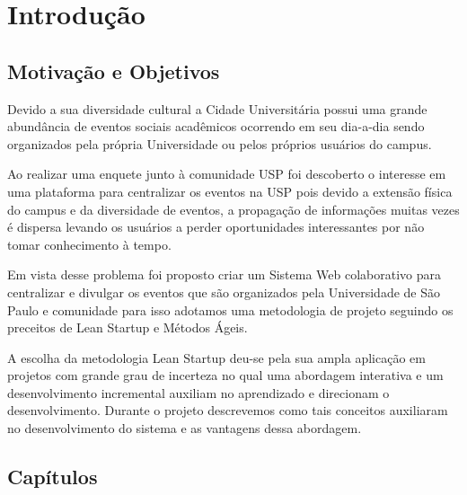 \chapter{Introdução}
\label{cap:introducao}
\section{Motivação e Objetivos}

\par Devido a sua diversidade cultural a Cidade Universitária possui uma grande abundância de eventos sociais acadêmicos ocorrendo em seu dia-a-dia sendo organizados pela própria Universidade ou pelos próprios usuários do campus.

\par Ao realizar uma enquete junto à comunidade USP foi descoberto o interesse em uma plataforma para centralizar os eventos na USP pois devido a extensão física do campus e da diversidade de eventos, a propagação de informações muitas vezes é dispersa levando os usuários a perder oportunidades interessantes por não tomar conhecimento à tempo.

\par Em vista desse problema foi proposto criar um Sistema Web colaborativo para centralizar e divulgar os eventos que são organizados pela Universidade de São Paulo e comunidade para isso adotamos uma metodologia de projeto seguindo os preceitos de Lean Startup e Métodos Ágeis.

\par A escolha da metodologia Lean Startup deu-se pela sua ampla aplicação em projetos com grande grau de incerteza no qual uma abordagem interativa e um desenvolvimento incremental auxiliam no aprendizado e direcionam o desenvolvimento. Durante o projeto descrevemos como tais conceitos auxiliaram no desenvolvimento do sistema e as vantagens dessa abordagem.

\section{Capítulos}
